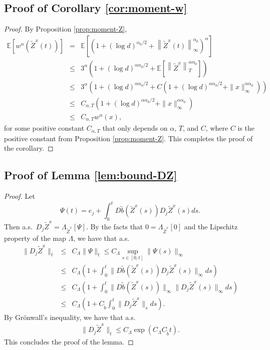 \documentclass[11pt]{article}
\theoremstyle{definition}
\theoremstyle{plain}
\newcommand{\E}{\mathbb{E}}
\newcommand{\tb}{\tilde{b}}
\begin{document}
\begin{appendices}
\subsection{Proof of Corollary \ref{cor:moment-w}}
\begin{proof}
By Proposition \ref{prop:moment-Z}, 
\begin{eqnarray*}
\E\left[w^\alpha \left(\tilde Z^x(t)\right)\right] &=& \E\left[\left(1+\left(\log d\right)^{\alpha_0/2} + \left\|\tilde Z^x(t)\right\|_\infty^{\alpha_0}\right)^\alpha \right] \\
&\leq & 3^{\alpha} \left(1 + \left(\log d\right)^{\alpha \alpha_0/2} + \E\left[\left\|\tilde Z^x\right\|_T^{\alpha \alpha_0}\right]\right) \\
&\leq & 3^{\alpha} \left(1 + \left(\log d\right)^{\alpha \alpha_0/2} + C \left(1 + (\log d)^{\alpha\alpha_0/2} + \|x\|^{\alpha\alpha_0}_\infty\right)\right) \\
&\leq & C_{\alpha, T} \left(1 + \left(\log d\right)^{\alpha \alpha_0/2} + \|x\|^{\alpha\alpha_0}_\infty\right) \\
&\leq & C_{\alpha, T} w^{\alpha}(x), 
\end{eqnarray*}
for some positive constant $C_{\alpha, T}$ that only depends on $\alpha$, $T$, and $C$, where $C$ is the positive constant from Proposition \ref{prop:moment-Z}. 
This completes the proof of the corollary.
\end{proof}

\subsection{Proof of Lemma \ref{lem:bound-DZ}}
\begin{proof}
Let 
\[
{\Psi}(t) = e_j + \int_0^t D \tb(\tilde{Z}^x(s)) D_j \tilde{Z}^x(s) ds.
\]
Then a.s.\ $D_j \tilde{Z}^x = \Lambda_{\tilde Z^x}[{\Psi}]$.
By the facts that $0 = \Lambda_{\tilde Z^x}[0]$ and the Lipschitz property of the map $\Lambda$, we have that a.s.
\begin{eqnarray*}
\| D_j \tilde{Z}^x \|_t 
&\leq & C_{\Lambda} \| {\Psi} \|_t \leq C_{\Lambda} \sup_{s\in [0,t]} \| {\Psi}(s) \|_\infty \\
&\leq & C_{\Lambda} \left( 1 + \int_0^t \| D\tb(\tilde Z^x(s)) D_j \tilde{Z}^x(s) \|_\infty ds \right)\\
&\leq & C_{\Lambda} \left( 1 + \int_0^t \| D\tb(\tilde Z^x(s)) \|_\infty \|D_j \tilde{Z}^x(s) \|_\infty ds \right)\\
&\leq & C_{\Lambda} \left( 1 + C_{\tb} \int_0^t \| D_j \tilde{Z}^x \|_s ds \right).
\end{eqnarray*}
By Grönwall’s inequality, we have that a.s.
\begin{align}
\| D_j \tilde{Z}^x \|_t \leq C_{\Lambda} \exp(C_{\Lambda} C_{\tb} t).
\end{align}
This concludes the proof of the lemma. 
\end{proof}


\end{appendices}
\end{document}
